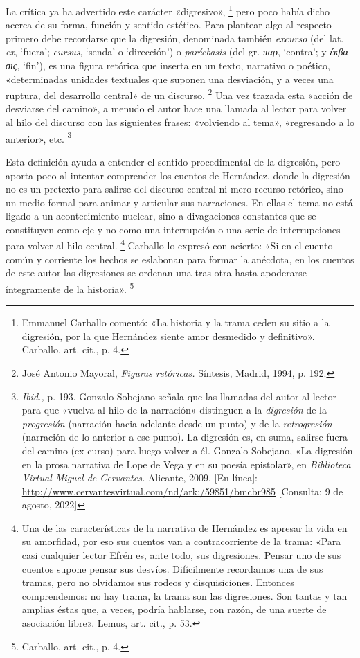\documentclass[14pt,twoside,final]{extbook} %
\let\oldfootnote\footnote
\renewcommand\footnote[1]{%
\oldfootnote{\hspace{1mm}#1}}
\begin{document}
La crítica ya ha advertido este carácter «digresivo»,\footnote{Emmanuel Carballo comentó: «La historia y la trama ceden su sitio a la digresión, por la que Hernández siente amor desmedido y definitivo». Carballo, art. cit., p. 4.} pero poco había dicho acerca de su forma, función y sentido estético. Para plantear algo al respecto primero debe recordarse que la digresión, denominada
también \emph{excurso} (del lat. \emph{ex}, `fuera'; \emph{cursus}, `senda' o `dirección') o \emph{parécbasis} (del gr. \textgreek{\itshape παρ}, `contra'; y \textgreek{\itshape έκβασις}, `fin'), es una figura retórica que inserta en un texto, narrativo o poético, «determinadas unidades textuales que suponen una desviación, y a veces una ruptura, del desarrollo central» de un discurso.\footnote{José Antonio Mayoral, \emph{Figuras retóricas.} Síntesis, Madrid, 1994, p. 192.} Una vez trazada esta «acción de desviarse del camino», a menudo el autor hace una llamada al lector para volver al hilo del discurso con las siguientes frases: «volviendo al tema», «regresando a lo anterior», etc.\footnote{\emph{Ibid.,} p. 193. Gonzalo Sobejano señala que las llamadas del autor al lector para que «vuelva al hilo de la narración» distinguen a la \emph{digresión} de la \emph{progresión} (narración hacia adelante desde un punto) y de la \emph{retrogresión} (narración de lo anterior a ese punto). La digresión es, en suma, salirse fuera del camino (ex-curso) para luego volver a él. Gonzalo Sobejano, «La digresión en la prosa narrativa de Lope de Vega y en su poesía epistolar», en \emph{Biblioteca Virtual Miguel de Cervantes.} Alicante, 2009. [En línea]: \url{http://www.cervantesvirtual.com/nd/ark:/59851/bmcbr985} [Consulta: 9 de agosto, 2022]}

Esta definición ayuda a entender el sentido procedimental de la digresión, pero aporta poco al intentar comprender los cuentos de Hernández, donde la digresión no es un pretexto para salirse del
discurso central ni mero recurso retórico, sino un medio formal para animar y articular sus narraciones. En ellas el tema no está ligado a un acontecimiento nuclear, sino a divagaciones constantes que se constituyen como eje y no como una interrupción o una serie de interrupciones para volver al hilo central.\footnote{Una de las características de la narrativa de Hernández es apresar la vida en su amorfidad, por eso sus cuentos van a contracorriente de la trama: «Para casi cualquier lector Efrén es, ante todo, sus digresiones. Pensar uno de sus cuentos supone pensar sus desvíos. Difícilmente recordamos una de sus tramas, pero no olvidamos sus rodeos y disquisiciones. Entonces comprendemos: no hay trama, la trama son las digresiones. Son tantas y tan amplias éstas que, a veces, podría hablarse, con razón, de una suerte de asociación libre». Lemus, art. cit., p. 53.} Carballo lo expresó con acierto: «Si en el cuento común y corriente los hechos se eslabonan para formar la anécdota, en los cuentos de este autor las digresiones se ordenan una tras otra hasta apoderarse íntegramente de la historia».\footnote{Carballo, art. cit., p. 4.}
\end{document}
